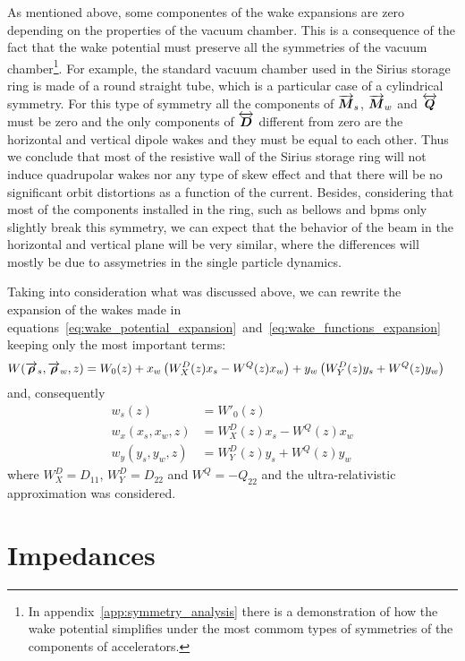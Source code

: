     As mentioned above, some componentes of the wake expansions are zero depending on the properties of the vacuum chamber. This is a consequence of the fact that the wake potential must preserve all the symmetries of the vacuum chamber\footnote{In appendix~\ref{app:symmetry_analysis} there is a demonstration of how the wake potential simplifies under the most commom types of symmetries of the components of accelerators.}. For example, the standard vacuum chamber used in the Sirius storage ring is made of a round straight tube, which is a particular case of a cylindrical symmetry. For this type of symmetry all the components of $\overrightarrow{\boldsymbol{M}}_s$, $\overrightarrow{\boldsymbol{M}}_w$ and $\overleftrightarrow{\boldsymbol{Q}}$ must be zero and the only components of $\overleftrightarrow{\boldsymbol{D}}$ different from zero are the horizontal and vertical dipole wakes and they must be equal to each other. Thus we conclude that most of the resistive wall of the Sirius storage ring will not induce quadrupolar wakes nor any type of skew effect and that there will be no significant orbit distortions as a function of the current. Besides, considering that most of the components installed in the ring, such as bellows and \gls{bpms} only slightly break this symmetry, we can expect that the behavior of the beam in the horizontal and vertical plane will be very similar, where the differences will mostly be due to assymetries in the single particle dynamics.

    Taking into consideration what was discussed above, we can rewrite the expansion of the wakes made in equations~\eqref{eq:wake_potential_expansion}~and~\eqref{eq:wake_functions_expansion} keeping only the most important terms:
    \begin{align}\label{eq:important_wake_potential}
  	  	W(\overrightarrow{\boldsymbol{\rho}}_s, \overrightarrow{\boldsymbol{\rho}}_w, z) &=
	  		W_0(z) +
			x_w\left(W^D_X(z)x_s - W^Q(z)x_w\right) +
			y_w\left(W^D_Y(z)y_s + W^Q(z)y_w\right)
    \end{align}
    and, consequently
    \begin{align}\label{eq:important_wakes}\nonumber
  		w_s(z) &= W'_0(z) \\
		w_x(x_s, x_w, z) &= W^D_X(z)x_s - W^Q(z)x_w \\\nonumber
		w_y(y_s, y_w, z) &= W^D_Y(z)y_s + W^Q(z)y_w
    \end{align}
    where $W^D_X = D_{11}$, $W^D_Y = D_{22}$ and $W^Q = -Q_{22}$ and the ultra-relativistic approximation was considered.

\section{Impedances}\label{sec:impedances}

